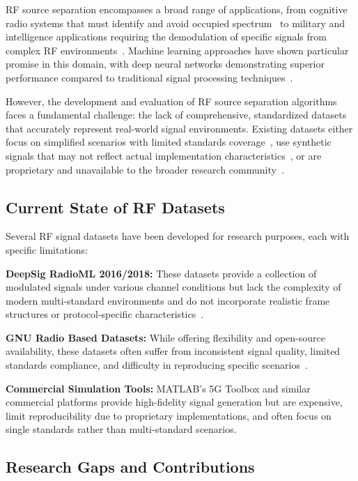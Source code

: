 \documentclass[twocolumn,10pt]{article}
\begin{document}
RF source separation encompasses a broad range of applications, from cognitive radio systems that must identify and avoid occupied spectrum~\cite{haykin2005cognitive} to military and intelligence applications requiring the demodulation of specific signals from complex RF environments~\cite{goldsmith2009breaking}. Machine learning approaches have shown particular promise in this domain, with deep neural networks demonstrating superior performance compared to traditional signal processing techniques~\cite{oshea2017introduction, west2017deep}.

However, the development and evaluation of RF source separation algorithms faces a fundamental challenge: the lack of comprehensive, standardized datasets that accurately represent real-world signal environments. Existing datasets either focus on simplified scenarios with limited standards coverage~\cite{oshea2018over}, use synthetic signals that may not reflect actual implementation characteristics~\cite{oshea2016convolutional}, or are proprietary and unavailable to the broader research community~\cite{rajendran2018deep}.

\subsection{Current State of RF Datasets}

Several RF signal datasets have been developed for research purposes, each with specific limitations:

\textbf{DeepSig RadioML 2016/2018:} These datasets provide a collection of modulated signals under various channel conditions but lack the complexity of modern multi-standard environments and do not incorporate realistic frame structures or protocol-specific characteristics~\cite{oshea2016radio, west2017deep}.

\textbf{GNU Radio Based Datasets:} While offering flexibility and open-source availability, these datasets often suffer from inconsistent signal quality, limited standards compliance, and difficulty in reproducing specific scenarios~\cite{blossom2004gnu}.

\textbf{Commercial Simulation Tools:} MATLAB's 5G Toolbox and similar commercial platforms provide high-fidelity signal generation but are expensive, limit reproducibility due to proprietary implementations, and often focus on single standards rather than multi-standard scenarios.

\subsection{Research Gaps and Contributions}
\end{document}

